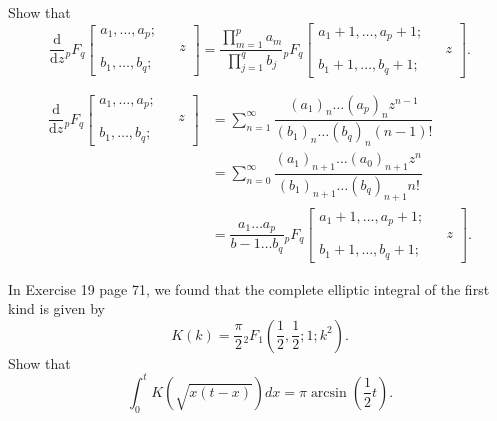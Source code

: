 \begin{problem}\label{problem12chapter5}
Show that
$$\dfrac{\mathrm{d}}{\mathrm{d}z} {}_pF_q \left[ \begin{array}{rlr}
a_1,\ldots,a_p; & & \\
& & z \\
b_1,\ldots,b_q; & &
\end{array} \right] = \dfrac{\displaystyle\prod_{m=1}^p a_m}{\displaystyle\prod_{j=1}^q b_j} {}_pF_q \left[ \begin{array}{rlr}
a_1+1, \ldots, a_p+1; & & \\
& & z \\
b_1+1, \ldots, b_q+1; & &
\end{array} \right].$$
\end{problem}
\begin{solution}
$$\begin{array}{ll}
\dfrac{\mathrm{d}}{\mathrm{d}z} {}_pF_q \left[ \begin{array}{rlr}
a_1, \ldots, a_p; & & \\
& & z \\
b_1, \ldots, b_q; & & 
\end{array} \right] &= \displaystyle\sum_{n=1}^{\infty} \dfrac{(a_1)_n \ldots (a_p)_n z^{n-1}}{(b_1)_n \ldots (b_q)_n (n-1)!} \\
&= \displaystyle\sum_{n=0}^{\infty} \dfrac{(a_1)_{n+1} \ldots (a_0)_{n+1} z^n}{ (b_1)_{n+1} \ldots (b_q)_{n+1} n!} \\
&= \dfrac{a_1 \ldots a_p}{b-1 \ldots b_q} {}_p F_q \left[ \begin{array}{rlr}
a_1+1, \ldots, a_p+1; & & \\
& & z \\
b_1+1, \ldots, b_q+1; & &
\end{array} \right].
\end{array}$$
\end{solution}
\begin{problem}\label{problem13chapter5}
In Exercise 19 page 71, we found that the complete elliptic integral of the first kind is given by
$$K(k) = \dfrac{\pi}{2}  {}_2F_1 \left( \dfrac{1}{2}, \dfrac{1}{2}; 1; k^2 \right).$$
Show that
$$\displaystyle\int_0^t K(\sqrt{x(t-x)}) dx = \pi \arcsin \left( \dfrac{1}{2} t \right).$$
\end{problem}
